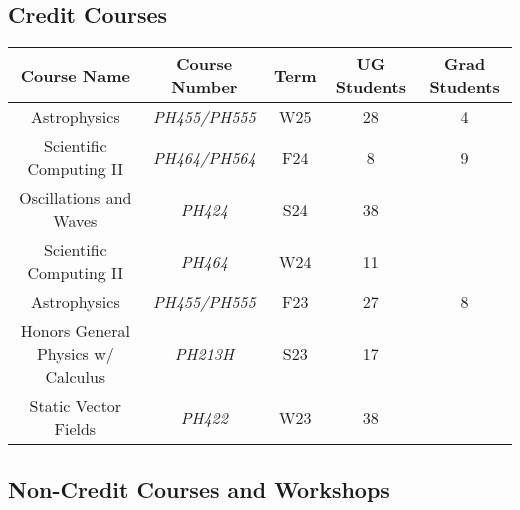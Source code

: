\documentclass[11pt,letterpaper,sans,unicode]{moderncv}
\begin{document}
\subsection{\hspace{0.2in}\color{color1} Credit Courses}
	\vspace*{1mm}
		\begin{center}
		\bgroup
		\small
		\def\arraystretch{1.5}
		\setlength\tabcolsep{0.5em}
		\begin{tabular}{|c|c|c|c|c|}%
		\hline
		\textbf{\color{color1} Course Name}			& Course Number		& Term	& UG Students 	& Grad Students \\
		\hline
		{\color{color1} Astrophysics}				& \emph{PH455/PH555}	& W25 	& 28  		& 4 \\
		\hline
		{\color{color1} Scientific Computing II}		& \emph{PH464/PH564}	& F24 	& 8  			& 9 \\
		\hline
		{\color{color1} Oscillations and Waves}		& \emph{PH424}		& S24 	& 38  		&  \\
		\hline
		{\color{color1} Scientific Computing II}		& \emph{PH464}		& W24 	& 11  		&  \\
		\hline
		{\color{color1} Astrophysics}				& \emph{PH455/PH555}	& F23 	& 27  		& 8 \\
		\hline
		{\color{color1} Honors General Physics w/ Calculus}	& \emph{PH213H}	& S23 	& 17  		&  \\
		\hline
		{\color{color1} Static Vector Fields}			& \emph{PH422}		& W23 	& 38  		&  \\
		\hline
		\end{tabular}
		\egroup
		\end{center}

\vspace*{3mm}
\subsection{\hspace{0.2in}\color{color1} Non-Credit Courses and Workshops}
\end{document}
